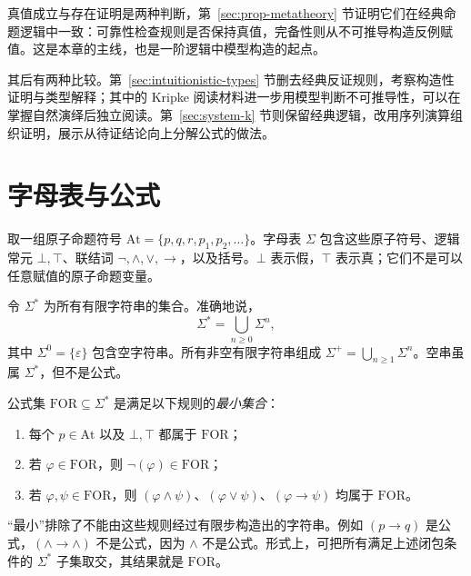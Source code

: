 \documentclass[lang=cn,a4paper,fontset=none,zihao=false,10pt,openany,twoside]{beautybook}
\numberwithin{algorithm}{chapter}
\newcommand{\FOR}{\mathrm{FOR}}
\newcommand{\At}{\mathrm{At}}
\begin{document}
真值成立与存在证明是两种判断，第~\ref{sec:prop-metatheory} 节证明它们在经典命题逻辑中一致：可靠性检查规则是否保持真值，完备性则从不可推导构造反例赋值。这是本章的主线，也是一阶逻辑中模型构造的起点。

其后有两种比较。第~\ref{sec:intuitionistic-types} 节删去经典反证规则，考察构造性证明与类型解释；其中的 Kripke 阅读材料进一步用模型判断不可推导性，可以在掌握自然演绎后独立阅读。第~\ref{sec:system-k} 节则保留经典逻辑，改用序列演算组织证明，展示从待证结论向上分解公式的做法。
\begin{center}
\end{center}

\section{字母表与公式}\label{sec:prop-syntax}
取一组原子命题符号 $\At=\{p,q,r,p_1,p_2,\ldots\}$。字母表 $\Sigma$ 包含这些原子符号、逻辑常元 $\bot,\top$、联结词 $\neg,\wedge,\vee,\to$，以及括号。$\bot$ 表示假，$\top$ 表示真；它们不是可以任意赋值的原子命题变量。

令 $\Sigma^*$ 为所有有限字符串的集合。准确地说，
\[
 \Sigma^*=\bigcup_{n\geq0}\Sigma^n,
\]
其中 $\Sigma^0=\{\varepsilon\}$ 包含空字符串。所有非空有限字符串组成 $\Sigma^+=\bigcup_{n\geq1}\Sigma^n$。空串虽属 $\Sigma^*$，但不是公式。

\begin{definition}
公式集 $\FOR\subseteq\Sigma^*$ 是满足以下规则的\emph{最小集合}：
\begin{enumerate}
\item 每个 $p\in\At$ 以及 $\bot,\top$ 都属于 $\FOR$；
\item 若 $\varphi\in\FOR$，则 $\neg(\varphi)\in\FOR$；
\item 若 $\varphi,\psi\in\FOR$，则 $(\varphi\wedge\psi)$、$(\varphi\vee\psi)$、$(\varphi\to\psi)$ 均属于 $\FOR$。
\end{enumerate}
\end{definition}
“最小”排除了不能由这些规则经过有限步构造出的字符串。例如 $(p\to q)$ 是公式，$(\wedge\to\wedge)$ 不是公式，因为 $\wedge$ 不是公式。形式上，可把所有满足上述闭包条件的 $\Sigma^*$ 子集取交，其结果就是 $\FOR$。
\end{document}
